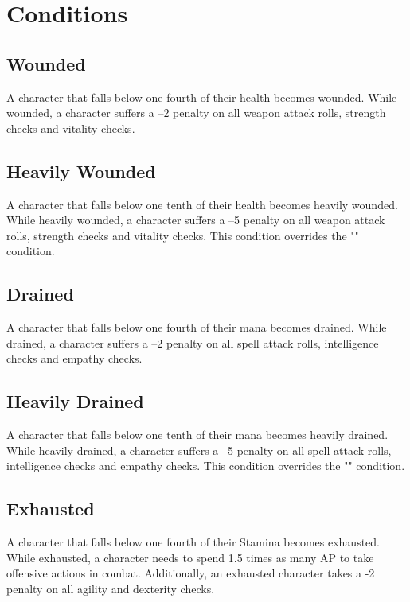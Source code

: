 \chapter{Conditions}\label{ch:conditions}
\section{Wounded}\label{condition:wounded}
A character that falls below one fourth of their health becomes wounded.
While wounded, a character suffers a --2 penalty on all weapon attack rolls, strength checks and vitality checks.

\section{Heavily Wounded}\label{condition:heavilyWounded}
A character that falls below one tenth of their health becomes heavily wounded.
While heavily wounded, a character suffers a --5 penalty on all weapon attack rolls, strength checks and vitality checks.
This condition overrides the "" condition.

\section{Drained}\label{condition:drained}
A character that falls below one fourth of their mana becomes drained.
While drained, a character suffers a --2 penalty on all spell attack rolls, intelligence checks and empathy checks.

\section{Heavily Drained}\label{condition:heavilyDrained}
A character that falls below one tenth of their mana becomes heavily drained.
While heavily drained, a character suffers a --5 penalty on all spell attack rolls, intelligence checks and empathy checks.
This condition overrides the "" condition.

\section{Exhausted}\label{condition:exhausted}
A character that falls below one fourth of their Stamina becomes exhausted.
While exhausted, a character needs to spend 1.5 times as many AP to take offensive actions in combat.
Additionally, an exhausted character takes a -2 penalty on all agility and dexterity checks.

